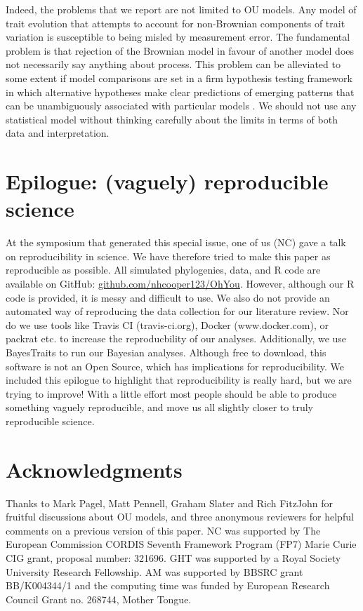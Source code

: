 \documentclass[a4paper,12pt]{article}
\begin{document}
  Indeed, the problems that we report are not limited to OU models. 
  Any model of trait evolution that attempts to account for non-Brownian components of trait variation is susceptible to being misled by measurement error. 
  The fundamental problem is that rejection of the Brownian model in favour of another model does not necessarily say anything about process. 
  This problem can be alleviated to some extent if model comparisons are set in a firm hypothesis testing framework in which alternative hypotheses make clear predictions of emerging patterns that can be unambiguously associated with particular models \citep[e.g.,][]{Cooper:2011aa}. 
  We should not use any statistical model without thinking carefully about the limits in terms of both data and interpretation. 

\section{Epilogue: (vaguely) reproducible science}
  At the symposium that generated this special issue, one of us (NC) gave a talk on reproducibility in science. 
  We have therefore tried to make this paper as reproducible as possible. 
  All simulated phylogenies, data, and R code are available on GitHub: \href{https://github.com/nhcooper123/OhYou}{github.com/nhcooper123/OhYou}.
  However, although our R code is provided, it is messy and difficult to use. 
  We also do not provide an automated way of reproducing the data collection for our literature review.
  Nor do we use tools like Travis CI (travis-ci.org), Docker (www.docker.com), or packrat \citep{Ushey:2015aa} etc. to increase the reproducbility of our analyses.
  Additionally, we use BayesTraits to run our Bayesian analyses. 
  Although free to download, this software is not an Open Source, which has implications for reproducibility.
  We included this epilogue to highlight that reproducibility is really hard, but we are trying to improve! 
  With a little effort most people should be able to produce something vaguely reproducible, and move us all slightly closer to truly reproducible science. 

\section{Acknowledgments}
  Thanks to Mark Pagel, Matt Pennell, Graham Slater and Rich FitzJohn for fruitful discussions about OU models, and three anonymous reviewers for helpful comments on a previous version of this paper. NC was supported by The European Commission CORDIS Seventh Framework Program (FP7) Marie Curie CIG grant, proposal number: 321696. GHT was supported by a Royal Society University Research Fellowship. AM was supported by BBSRC grant BB/K004344/1 and the computing time was funded by European Research Council Grant no. 268744, Mother Tongue.
\end{document}
